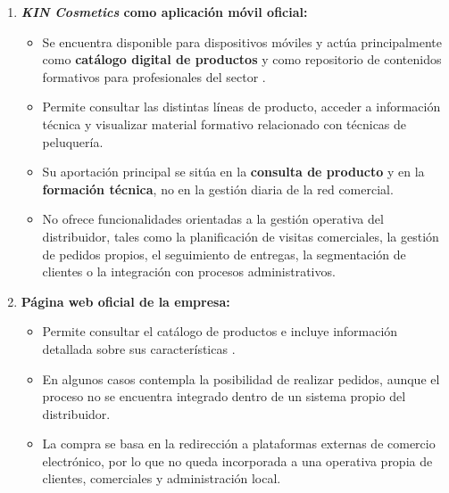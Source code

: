 \begin{enumerate}[label=\textbf{\arabic*.}, leftmargin=1.1cm, itemsep=0.45em, topsep=0.25em]
  \item \textbf{\textit{KIN Cosmetics} como aplicación móvil oficial:}
  \begin{itemize}[topsep=0.1em, itemsep=0.15em]
    \item Se encuentra disponible para dispositivos móviles y actúa principalmente como \textbf{catálogo digital de productos} y como repositorio de contenidos formativos para profesionales del sector \citep{kintrends}.
    \item Permite consultar las distintas líneas de producto, acceder a información técnica y visualizar material formativo relacionado con técnicas de peluquería.
    \item Su aportación principal se sitúa en la \textbf{consulta de producto} y en la \textbf{formación técnica}, no en la gestión diaria de la red comercial.
    \item No ofrece funcionalidades orientadas a la gestión operativa del distribuidor, tales como la planificación de visitas comerciales, la gestión de pedidos propios, el seguimiento de entregas, la segmentación de clientes o la integración con procesos administrativos.
  \end{itemize}

  \item \textbf{Página web oficial de la empresa:}
  \begin{itemize}[topsep=0.1em, itemsep=0.15em]
    \item Permite consultar el catálogo de productos e incluye información detallada sobre sus características \citep{kincosmetics_web}.
    \item En algunos casos contempla la posibilidad de realizar pedidos, aunque el proceso no se encuentra integrado dentro de un sistema propio del distribuidor.
    \item La compra se basa en la redirección a plataformas externas de comercio electrónico, por lo que no queda incorporada a una operativa propia de clientes, comerciales y administración local.
  \end{itemize}


\end{enumerate}
